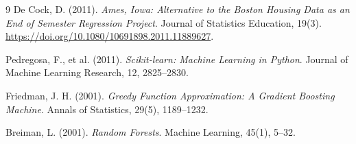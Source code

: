 \documentclass[11pt,a4paper]{article}
\begin{document}
\begin{thebibliography}{9}
De Cock, D. (2011). 
\textit{Ames, Iowa: Alternative to the Boston Housing Data as an End of Semester Regression Project}. 
Journal of Statistics Education, 19(3). \url{https://doi.org/10.1080/10691898.2011.11889627}.

Pedregosa, F., et al. (2011). 
\textit{Scikit-learn: Machine Learning in Python}. 
Journal of Machine Learning Research, 12, 2825--2830.

Friedman, J. H. (2001). 
\textit{Greedy Function Approximation: A Gradient Boosting Machine}. 
Annals of Statistics, 29(5), 1189--1232.

Breiman, L. (2001). 
\textit{Random Forests}. 
Machine Learning, 45(1), 5--32.
\end{thebibliography}
\end{document}
